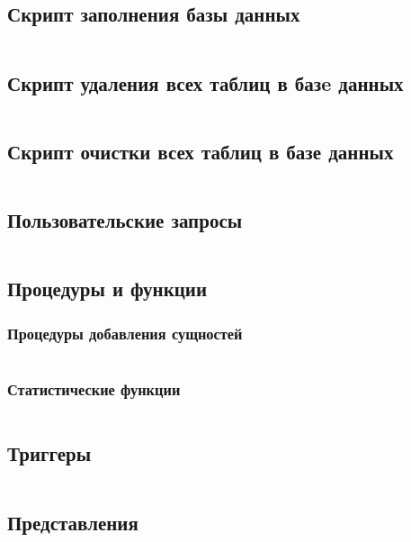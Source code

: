 \documentclass[12 pt, a4paper]{article}
\begin{document}
\subsection{Скрипт заполнения базы данных}
\inputminted{sql}{../scripts/fill_db.sql}
\subsection{Скрипт удаления всех таблиц в базe данных}
\inputminted{sql}{../scripts/drop_db.sql}
\subsection{Скрипт очистки всех таблиц в базе данных}
\inputminted{sql}{../scripts/clear_db.sql}
\subsection{Пользовательские запросы}
\inputminted{sql}{../scripts/user_queries.sql}
\subsection{Процедуры и функции}
\subsubsection{Процедуры добавления сущностей}
\inputminted{sql}{../scripts/add_procedures.sql}
\subsubsection{Статистические функции}
\inputminted{sql}{../scripts/statistic_functions.sql}
\subsection{Триггеры}
\inputminted{sql}{../scripts/triggers.sql}
\subsection{Представления}
\inputminted{sql}{../scripts/views.sql}
\end{document}

